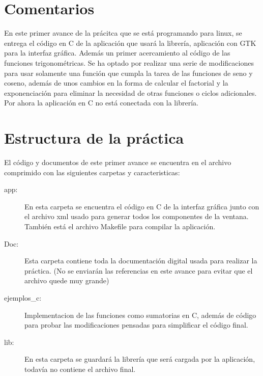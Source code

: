 \documentclass[%
	final,
	notitlepage,
	narroweqnarray,
	inline,
	twoside,
	]{ieee}
\begin{document}
\section{Comentarios}

\PARstart En este primer avance de la prácitca que se está programando  
para linux, se entrega el código en C de la aplicación
que usará la librería, aplicación con GTK para la interfaz gráfica.
Además un primer acercamiento al código de las funciones trigonométricas.
Se ha optado por realizar una serie de modificaciones para usar
solamente una función que cumpla la tarea de las funciones de seno
y coseno, además de unos cambios en la forma de calcular el factorial y
la exponenciación para eliminar la necesidad de otras funciones o ciclos adicionales.\\
Por ahora la aplicación en C no está conectada con la librería.

\section{ Estructura de la práctica}

El código y documentos de este primer avance se encuentra en el archivo
comprimido con las siguientes carpetas y caracteristicas:
\begin{description}
\item[app:] En esta carpeta se encuentra el código en C de la
interfaz gráfica junto con el archivo xml usado para generar todos los
componentes de la ventana. También está el archivo Makefile para
compilar la aplicación.

\item[Doc:] Esta carpeta contiene toda la documentación digital usada
para realizar la práctica. (No se enviarán las referencias en este avance para
evitar que el archivo quede muy grande)
\item[ejemplos\_c:] Implementacion de las funciones como sumatorias
en C, además de código para probar las modificaciones pensadas para
simplificar el código final.
\item[lib:] En esta carpeta se guardará la librería que será cargada por la aplicación,
todavía no contiene el archivo final.\\
\end{description}
\end{document}
